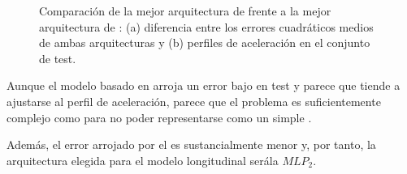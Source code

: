 \begin{figure}
	\centering
	\qquad
	\caption[Comparación entre los dos tipos de modelo longitudinal]{Comparación de la mejor arquitectura de  frente a la mejor arquitectura de : (a) diferencia entre los errores cuadráticos medios de ambas arquitecturas y (b) perfiles de aceleración en el conjunto de test.}
	\label{fig:cf-comparison-between-best-mlp-and-fcs-architecture}
\end{figure}

Aunque el modelo basado en  arroja un error bajo en test y parece que tiende a ajustarse al perfil de aceleración, parece que el problema es suficientemente complejo como para no poder representarse como un simple .

Además, el error arrojado por el  es sustancialmente menor y, por tanto, la arquitectura elegida para el modelo longitudinal serála $MLP_2$.

